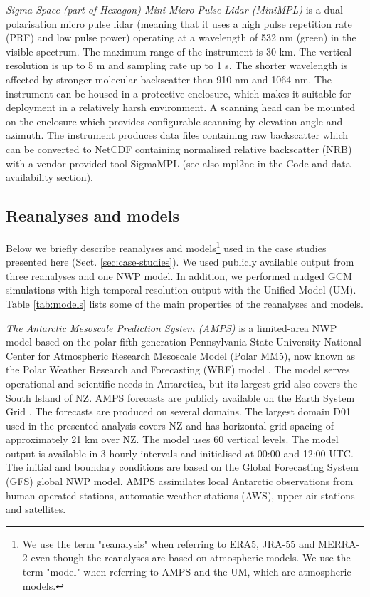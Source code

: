 \textit{Sigma Space (part of Hexagon) Mini Micro Pulse Lidar (MiniMPL)} \citep{spinhirne1993,campbell2002,flynn2007} is a
dual-polarisation micro pulse lidar (meaning that it uses a high pulse repetition rate (PRF) and low pulse power)
operating at a wavelength of 532 nm (green) in the visible spectrum. The maximum range of the
instrument is 30 km. The vertical resolution is up to 5 m and sampling rate up
to 1 s. The shorter wavelength is affected
by stronger molecular backscatter than 910 nm and 1064 nm.
The instrument can be housed in a protective enclosure, which makes it suitable
for deployment in a relatively harsh environment. A scanning head can be
mounted on the enclosure which provides configurable scanning by elevation
angle and azimuth. The instrument produces data files containing raw
backscatter which can be converted to NetCDF containing normalised relative
backscatter (NRB) with a vendor-provided tool SigmaMPL
(see also mpl2nc in the Code and data availability section).

\subsection{Reanalyses and models}
\label{sec:reanalyses-and-models}

Below we briefly describe reanalyses and models\footnote{We use the term "reanalysis" when referring to ERA5, JRA-55 and MERRA-2 even though the reanalyses are based on atmospheric models. We use the term "model" when referring to AMPS and the UM, which are atmospheric models.} used in the case studies
presented here (Sect. \ref{sec:case-studies}). We used publicly available output from three reanalyses and one NWP model. In addition, we performed nudged GCM simulations with
high-temporal resolution output with the Unified Model (UM).
Table \ref{tab:models} lists some of the main properties of the reanalyses and
models.

\textit{The Antarctic Mesoscale Prediction System (AMPS)} \citep{powers2003}
is a limited-area NWP model based on the polar fifth-generation Pennsylvania State
University-National Center for Atmospheric Research Mesoscale Model (Polar MM5),
now known as the Polar Weather Research and Forecasting (WRF) model \citep{hines2008}.
The model serves operational and scientific needs in Antarctica, but its largest grid also covers the South Island of NZ.
AMPS forecasts are publicly available on the Earth System Grid
\citep{williams2009b}.
The forecasts are produced on several domains. The largest domain D01 used in the presented analysis covers
NZ and has horizontal grid spacing of approximately 21 km over NZ. The model uses 60 vertical levels. The model output is available
in 3-hourly intervals and initialised at 00:00 and 12:00 UTC. The initial and
boundary conditions are based on the Global Forecasting System (GFS) global
NWP model. AMPS assimilates local Antarctic observations from human-operated stations, automatic
weather stations (AWS), upper-air stations and satellites.

